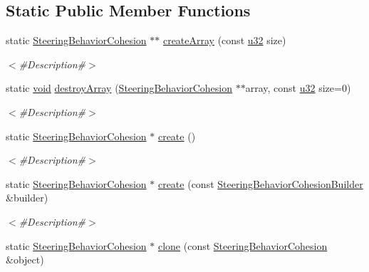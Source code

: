 \subsection*{Static Public Member Functions}
\begin{DoxyCompactItemize}
\item 
static \mbox{\hyperlink{classnjli_1_1_steering_behavior_cohesion}{Steering\+Behavior\+Cohesion}} $\ast$$\ast$ \mbox{\hyperlink{classnjli_1_1_steering_behavior_cohesion_a8d370c8c902af821e61df18a59f4757d}{create\+Array}} (const \mbox{\hyperlink{_util_8h_a10e94b422ef0c20dcdec20d31a1f5049}{u32}} size)
\begin{DoxyCompactList}\small\item\em $<$\#\+Description\#$>$ \end{DoxyCompactList}\item 
static \mbox{\hyperlink{_thread_8h_af1e856da2e658414cb2456cb6f7ebc66}{void}} \mbox{\hyperlink{classnjli_1_1_steering_behavior_cohesion_a0a5ef08843ce560e0b9af63b2fc8bcc5}{destroy\+Array}} (\mbox{\hyperlink{classnjli_1_1_steering_behavior_cohesion}{Steering\+Behavior\+Cohesion}} $\ast$$\ast$array, const \mbox{\hyperlink{_util_8h_a10e94b422ef0c20dcdec20d31a1f5049}{u32}} size=0)
\begin{DoxyCompactList}\small\item\em $<$\#\+Description\#$>$ \end{DoxyCompactList}\item 
static \mbox{\hyperlink{classnjli_1_1_steering_behavior_cohesion}{Steering\+Behavior\+Cohesion}} $\ast$ \mbox{\hyperlink{classnjli_1_1_steering_behavior_cohesion_a5cfbb1db9c82f6517dbf6f354624a0cf}{create}} ()
\begin{DoxyCompactList}\small\item\em $<$\#\+Description\#$>$ \end{DoxyCompactList}\item 
static \mbox{\hyperlink{classnjli_1_1_steering_behavior_cohesion}{Steering\+Behavior\+Cohesion}} $\ast$ \mbox{\hyperlink{classnjli_1_1_steering_behavior_cohesion_ad4617cdfd7a1faea75b249091a8fd610}{create}} (const \mbox{\hyperlink{classnjli_1_1_steering_behavior_cohesion_builder}{Steering\+Behavior\+Cohesion\+Builder}} \&builder)
\begin{DoxyCompactList}\small\item\em $<$\#\+Description\#$>$ \end{DoxyCompactList}\item 
static \mbox{\hyperlink{classnjli_1_1_steering_behavior_cohesion}{Steering\+Behavior\+Cohesion}} $\ast$ \mbox{\hyperlink{classnjli_1_1_steering_behavior_cohesion_ad212794313ea653c1b765366ad423543}{clone}} (const \mbox{\hyperlink{classnjli_1_1_steering_behavior_cohesion}{Steering\+Behavior\+Cohesion}} \&object)

\end{DoxyCompactItemize}

